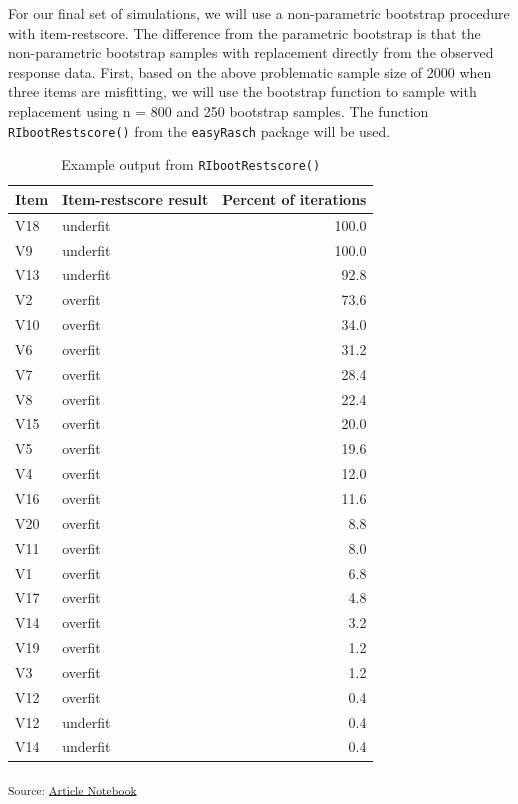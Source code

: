 \documentclass[
  letterpaper,
  DIV=11,
  numbers=noendperiod]{scrartcl}
\begin{document}
For our final set of simulations, we will use a non-parametric bootstrap
procedure with item-restscore. The difference from the parametric
bootstrap is that the non-parametric bootstrap samples with replacement
directly from the observed response data. First, based on the above
problematic sample size of 2000 when three items are misfitting, we will
use the bootstrap function to sample with replacement using n = 800 and
250 bootstrap samples. The function \texttt{RIbootRestscore()} from the
\texttt{easyRasch} package will be used.

\begin{longtable}[]{@{}llr@{}}

\caption{\label{tbl-bootir}Example output from
\texttt{RIbootRestscore()}}

\tabularnewline

\toprule\noalign{}
Item & Item-restscore result & Percent of iterations \\
\midrule\noalign{}
\endhead
\bottomrule\noalign{}
\endlastfoot
V18 & underfit & 100.0 \\
V9 & underfit & 100.0 \\
V13 & underfit & 92.8 \\
V2 & overfit & 73.6 \\
V10 & overfit & 34.0 \\
V6 & overfit & 31.2 \\
V7 & overfit & 28.4 \\
V8 & overfit & 22.4 \\
V15 & overfit & 20.0 \\
V5 & overfit & 19.6 \\
V4 & overfit & 12.0 \\
V16 & overfit & 11.6 \\
V20 & overfit & 8.8 \\
V11 & overfit & 8.0 \\
V1 & overfit & 6.8 \\
V17 & overfit & 4.8 \\
V14 & overfit & 3.2 \\
V19 & overfit & 1.2 \\
V3 & overfit & 1.2 \\
V12 & overfit & 0.4 \\
V12 & underfit & 0.4 \\
V14 & underfit & 0.4 \\

\end{longtable}

\textsubscript{Source:
\href{https://pgmj.github.io/rasch_itemfit/index.qmd.html}{Article
Notebook}}
\end{document}
